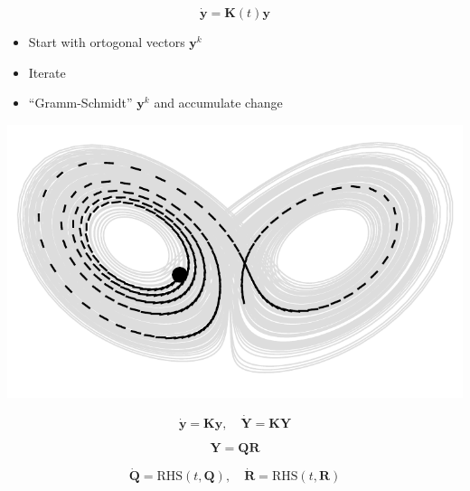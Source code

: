 \begin{equation*}
\dot{\mathbf{y}} = \mathbf{K}(t) \mathbf{y}
\end{equation*}

\begin{itemize}
\item Start with ortogonal vectors $\mathbf{y}^k$
\item Iterate
\item ``Gramm-Schmidt'' $\mathbf{y}^k$ and accumulate change
\end{itemize}
\eframe

\begin{center}
  \includegraphics[width=\textwidth]{i/wolf.pdf}
\end{center}
\eframe

\begin{equation*}
\dot{\mathbf{y}} = \mathbf{K} \mathbf{y}, \quad
\dot{\mathbf{Y}} = \mathbf{K} \mathbf{Y}
\end{equation*}

\begin{equation*}
\mathbf{Y} = \mathbf{Q} \mathbf{R}
\end{equation*}

\begin{equation*}
\dot{\mathbf{Q}} = \text{RHS}(t, \mathbf{Q}),
\quad
\dot{\mathbf{R}} = \text{RHS}(t, \mathbf{R})
\end{equation*}

\eframe
